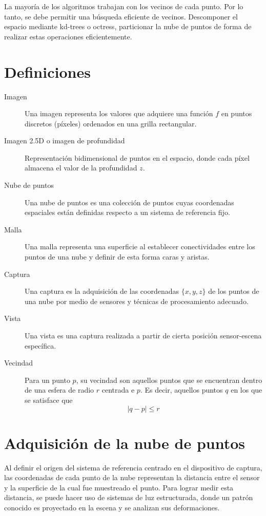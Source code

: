La mayoría de los algoritmos trabajan con los vecinos de cada punto.
Por lo tanto, se debe permitir una búsqueda eficiente de vecinos.
Descomponer el espacio mediante kd-trees o octress,
particionar la nube de puntos de forma de realizar estas operaciones eficientemente.

\section{Definiciones}
\begin{description}
	\item [Imagen]
		Una imagen representa los valores que adquiere una función $f$
		en puntos discretos (píxeles) ordenados en una grilla rectangular.
	\item [Imagen 2.5D o imagen de profundidad]
		Representación bidimensional de puntos en el espacio, donde cada píxel
		almacena el valor de la profundidad $z$.
	\item [Nube de puntos]
		Una nube de puntos es una colección de puntos cuyas coordenadas espaciales
		están definidas respecto a un sistema de referencia fijo.
	\item [Malla]
		Una malla representa una superficie al establecer conectividades entre
		los puntos de una nube y definir de esta forma caras y aristas.
	\item [Captura]
		Una captura es la adquisición de las coordenadas $\{x, y, z\}$ de los puntos de una nube
		por medio de sensores y técnicas de procesamiento adecuado.
	\item [Vista]
		Una vista es una captura realizada a partir de cierta posición sensor-escena específica.
	\item [Vecindad]
		Para un punto $p$, su vecindad son aquellos puntos que se encuentran
		dentro de una esfera de radio $r$ centrada e $p$. Es decir, aquellos
		puntos $q$ en los que se satisface que
		\[ |q - p| \leq r \]
\end{description}

\section{Adquisición de la nube de puntos}
Al definir el origen del sistema de referencia centrado en el dispositivo de captura,
las coordenadas de cada punto de la nube representan la distancia entre el sensor y la superficie
de la cual fue muestreado el punto.
Para lograr medir esta distancia, se puede hacer uso de sistemas de luz estructurada,
donde un patrón conocido es proyectado en la escena y se analizan sus deformaciones.


